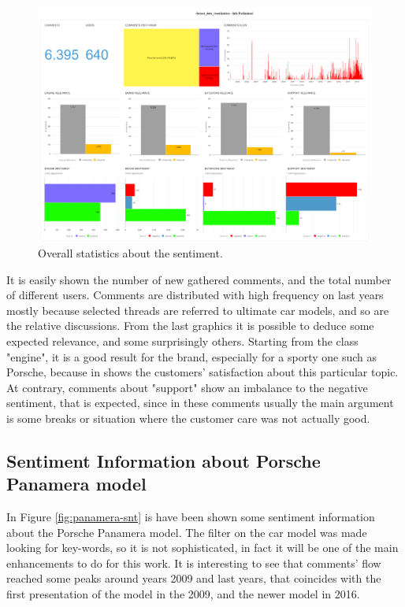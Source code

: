 \begin{figure}[H]
	\centering
	\includegraphics[width=\textwidth]{figures/odv_export/dataset_data_visualization_1.pdf}
	\caption{Overall statistics about the sentiment.}
	\label{fig:preliminar-info}
\end{figure}

It is easily shown the number of new gathered comments, and the total number of different users. Comments are distributed with high frequency on last years mostly because selected threads are referred to ultimate car models, and so are the relative discussions. From the last graphics it is possible to deduce some expected relevance, and some surprisingly others. Starting from the class "engine", it is a good result for the brand, especially for a sporty one such as Porsche, because in shows the customers' satisfaction about this particular topic. At contrary, comments about "support" show an imbalance to the negative sentiment, that is expected, since in these comments usually the main argument is some breaks or situation where the customer care was not actually good.


\subsection{Sentiment Information about Porsche Panamera model}

In Figure \ref{fig:panamera-snt} is have been shown some sentiment information about the Porsche Panamera model. The filter on the car model was made looking for key-words, so it is not sophisticated, in fact it will be one of the main enhancements to do for this work. It is interesting to see that comments' flow reached some peaks around years 2009 and last years, that coincides with the first presentation of the model in the 2009, and the newer model in 2016.

